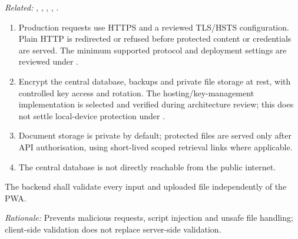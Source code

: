 \textit{Related:} \hyperref[fr:002]{}, \hyperref[fr:038]{}, \hyperref[fr:039]{}, \hyperref[fr:040]{}, \hyperref[fr:042]{}.
\begin{enumerate}[label=(\alph*),leftmargin=*,itemsep=1pt,topsep=3pt]
\item Production requests use HTTPS and a reviewed TLS/HSTS configuration. Plain HTTP is redirected or refused before protected content or credentials are served. The minimum supported protocol and deployment settings are reviewed under .
\item Encrypt the central database, backups and private file storage at rest, with controlled key access and rotation. The hosting/key-management implementation is selected and verified during architecture review; this does not settle local-device protection under .
\item Document storage is private by default; protected files are served only after API authorisation, using short-lived scoped retrieval links where applicable.
\item The central database is not directly reachable from the public internet.
\end{enumerate}

\label{nfr:SEC-05}
The backend shall validate every input and uploaded file independently of the PWA.

\textit{Rationale:} Prevents malicious requests, script injection and unsafe file handling; client-side validation does not replace server-side validation.

